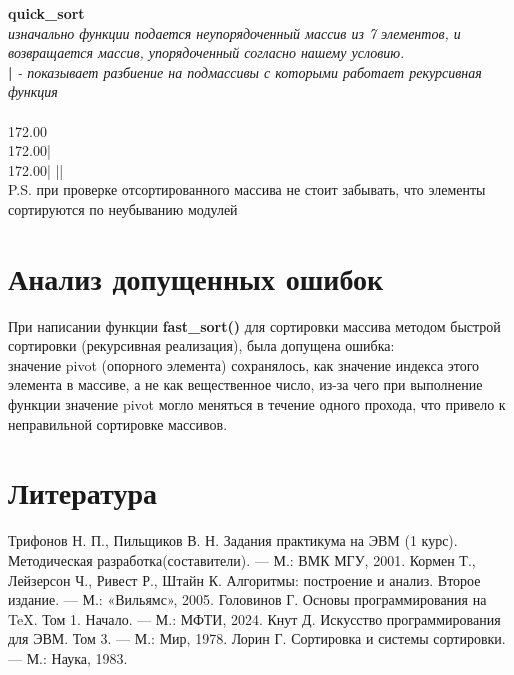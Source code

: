 \documentclass[a4paper,11pt]{article}
\begin{document}
    \vspace{0.1cm}
    \textbf{quick\_sort} \\
    \textit{изначально функции подается неупорядоченный массив из 7 элементов, и возвращается массив, упорядоченный согласно нашему условию.}\\ 
    \textbf{|} \textit {- показывает разбиение на подмассивы с которыми работает рекурсивная функция}\\
    \vspace{0.1cm}\\
    172.00\qquad \\ 
    172.00\quad | \qquad \\ 
    172.00\quad | \quad|\quad| \qquad \\ 
    
    \vspace{0.5cm}
    \small{P.S. при проверке отсортированного массива не стоит забывать, что элементы сортируются по неубыванию модулей}

    \newpage
    \section{Анализ допущенных ошибок}
    \vspace{0,5cm}
    При написании функции 
    \textbf{fast\_sort()} для сортировки массива методом быстрой сортировки (рекурсивная реализация), была допущена ошибка: \\
    значение pivot (опорного элемента) сохранялось, как значение индекса этого элемента в массиве, а не как вещественное число, из-за чего при выполнение функции значение pivot могло меняться в течение одного прохода, что привело к неправильной сортировке массивов.   


    \newpage
    \section{Литература}
    \vspace{0.5cm}

    \begin{thebibliography}{10}
        \vspace{0.5cm}
        \bibitem{}
        Трифонов Н. П., Пильщиков В. Н. Задания практикума на ЭВМ (1 курс). Методическая разработка(составители). — М.: ВМК МГУ, 2001.
        \bibitem{}
        Кормен Т., Лейзерсон Ч., Ривест Р., Штайн К. Алгоритмы: построение и анализ. Второе издание.
        — М.: «Вильямс», 2005.
        \bibitem{}
        Головинов Г.  Основы программирования на TeX. Том 1. Начало. — М.: МФТИ, 2024.
        \bibitem{}
        Кнут Д. Искусство программирования для ЭВМ. Том 3. — М.: Мир, 1978.
        \bibitem{}
        Лорин Г. Сортировка и системы сортировки. — М.: Наука, 1983.
    \end{thebibliography}

    
\end{document}
